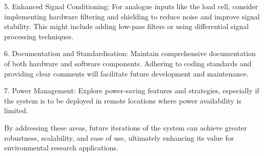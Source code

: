 5. Enhanced Signal Conditioning: For analogue inputs like the load cell, consider implementing hardware filtering and shielding to reduce noise and improve signal stability. This might include adding low-pass filters or using differential signal processing techniques.

6. Documentation and Standardisation: Maintain comprehensive documentation of both hardware and software components. Adhering to coding standards and providing clear comments will facilitate future development and maintenance.

7. Power Management: Explore power-saving features and strategies, especially if the system is to be deployed in remote locations where power availability is limited.

By addressing these areas, future iterations of the system can achieve greater robustness, scalability, and ease of use, ultimately enhancing its value for environmental research applications.